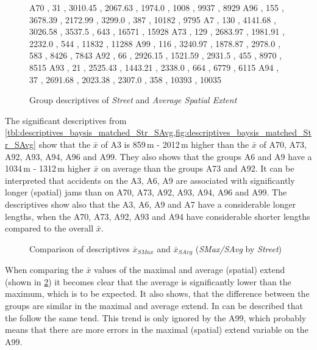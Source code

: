 \begin{figure}[ht!]
\begin{minipage}{0.55\textwidth}
{			A70 , 31  , 3010.45 , 2067.63 , 1974.0 , 1008 , 9937  , 8929 
			A96 , 155 , 3678.39 , 2172.99 , 3299.0 , 387  , 10182 , 9795 
			A7  , 130 , 4141.68 , 3026.58 , 3537.5 , 643  , 16571 , 15928
			A73 , 129 , 2683.97 , 1981.91 , 2232.0 , 544  , 11832 , 11288
			A99 , 116 , 3240.97 , 1878.87 , 2978.0 , 583  , 8426  , 7843 
			A92 , 66  , 2926.15 , 1521.59 , 2931.5 , 455  , 8970  , 8515 
			A93 , 21  , 2525.43 , 1443.21 , 2338.0 , 664  , 6779  , 6115 
			A94 , 37  , 2691.68 , 2023.38 , 2307.0 , 358  , 10393 , 10035
		}\data
		\pgfplotstablesort[sort key=mean, sort cmp=float >]{\datasorted}{\data}
        \tiny
        \centering
		\label{fig:descriptives_baysis_matched_Str_SAvg}
	\end{minipage}%
	\caption{Group descriptives of \textit{Street} and \textit{Average Spatial Extent}}
\end{figure}
The significant descriptives from \cref{tbl:descriptives_baysis_matched_Str_SAvg,fig:descriptives_baysis_matched_Str_SAvg} show that the $\bar{x}$ of A3 is 859\,m - 2012\,m higher than the $\bar{x}$ of A70, A73, A92, A93, A94, A96 and A99. They also shows that the groups A6 and A9 have a 1034\,m - 1312\,m higher $\bar{x}$ on average than the groups A73 and A92. It can be interpreted that accidents on the A3, A6, A9 are associated with significantly longer (spatial) jams than on A70, A73, A92, A93, A94, A96 and A99. The descriptives show also that the A3, A6, A9 and A7 have a considerable longer lengths, when the A70, A73, A92, A93 and A94 have considerable shorter lengths compared to the overall $\bar{x}$.
\begin{figure}[ht!]
	\data
    \pgfplotstablesort[sort key=meanSAvg, sort cmp=float >]{\datasorted}{\data}
    \tiny
    \centering
	\caption{Comparison of descriptives $\bar{x}_{SMax}$ and $\bar{x}_{SAvg}$ (\textit{SMax/SAvg} by \textit{Street})}
	\label{fig:baysis_matched_meancomparison_Str_spatial}
\end{figure}
When comparing the $\bar{x}$ values of the maximal and average (spatial) extend (shown in \cref{fig:baysis_matched_meancomparison_Str_spatial}) it becomes clear that the average is significantly lower than the maximum, which is to be expected. It also shows, that the difference between the groups are similar in the maximal and average extend. In can be described that the follow the same tend. This trend is only ignored by the A99, which probably means that there are more errors in the maximal (spatial) extend variable on the A99.

